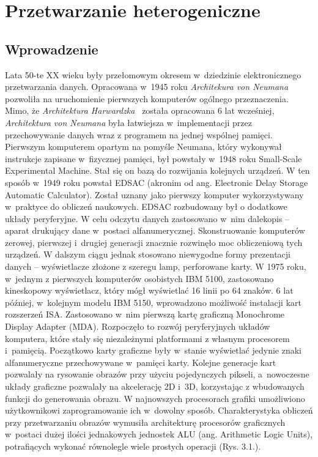 \chapter{Przetwarzanie heterogeniczne}\label{cha:hpo}


\section{Wprowadzenie}\label{sec:wprowadzenie}


Lata 50-te XX wieku były przełomowym okresem w~dziedzinie elektronicznego przetwarzania danych. Opracowana w~1945 roku \emph{Architekura von Neumana}~\cite{b16} pozwoliła na uruchomienie pierwszych komputerów ogólnego przeznaczenia. Mimo, że \emph{Architektura Harwardzka}~\cite{b17} została opracowana 6 lat wcześniej, \emph{Architektura von Neumana} była łatwiejsza w~implementacji przez przechowywanie danych wraz z programem na jednej wspólnej pamięci. Pierwszym komputerem opartym na pomyśle Neumana, który wykonywał instrukcje zapisane w~fizycznej pamięci, był powstały w~1948 roku Small-Scale Experimental Machine. Stał się on bazą do rozwijania kolejnych urządzeń. W ten sposób w~1949 roku powstał EDSAC (akronim od ang. Electronic Delay Storage Automatic Calculator). Został uznany jako  pierwszy komputer wykorzystywany w~praktyce do obliczeń naukowych. EDSAC rozbudowany był o dodatkowe układy peryferyjne. W celu odczytu danych zastosowano w~nim dalekopis – aparat drukujący dane w~postaci alfanumerycznej. Skonstruowanie komputerów zerowej, pierwszej i~drugiej generacji znacznie rozwinęło moc obliczeniową tych urządzeń. W dalszym ciągu jednak stosowano niewygodne formy prezentacji danych – wyświetlacze złożone z szeregu lamp, perforowane karty. W 1975 roku, w~jednym z pierwszych komputerów osobistych IBM 5100, zastosowano kineskopowy wyświetlacz, który mógł wyświetlać 16 linii po 64 znaków. 6 lat później, w~kolejnym modelu IBM 5150, wprowadzono możliwość instalacji kart rozszerzeń ISA. Zastosowano w~nim pierwszą kartę graficzną Monochrome Display Adapter (MDA). Rozpoczęło to rozwój peryferyjnych układów komputera, które stały się niezależnymi platformami z własnym procesorem i~pamięcią. Początkowo karty graficzne były w~stanie wyświetlać jedynie znaki alfanumeryczne przechowywane w~pamięci karty. Kolejne generacje kart pozwalały na rysowanie obrazów przy użyciu pojedynczych pikseli, a~nowoczesne układy graficzne pozwalały na akcelerację 2D i~3D, korzystając z wbudowanych funkcji do generowania obrazu. W najnowszych procesorach grafiki umożliwiono użytkownikowi zaprogramowanie ich w~dowolny sposób. Charakterystyka obliczeń przy przetwarzaniu obrazów wymusiła architekturę procesorów graficznych w~postaci dużej ilości jednakowych jednostek ALU (ang. Arithmetic Logic Units), potrafiących wykonać równolegle wiele prostych operacji (Rys. 3.1.).
